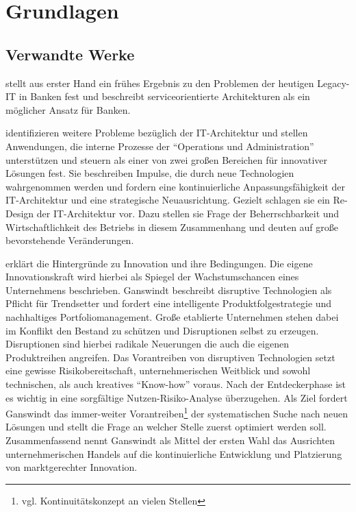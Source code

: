 \chapter{Grundlagen}
\label{chapter:grundlagen}

\section{Verwandte Werke}
\citet{Brockhoff2006} stellt aus erster Hand ein frühes Ergebnis zu den Problemen der heutigen Legacy-IT in Banken fest und beschreibt serviceorientierte Architekturen als ein möglicher Ansatz für Banken.

\citet{Bussmann2006} identifizieren weitere Probleme bezüglich der IT-Architektur und stellen Anwendungen, die interne Prozesse der \enquote{Operations und Administration} unterstützen und steuern als einer von zwei großen Bereichen für innovativer Lösungen fest. Sie beschreiben Impulse, die durch neue Technologien wahrgenommen werden und fordern eine kontinuierliche Anpassungsfähigkeit der IT-Architektur und eine strategische Neuausrichtung. Gezielt schlagen sie ein Re-Design der IT-Architektur vor. Dazu stellen sie Frage der Beherrschbarkeit und Wirtschaftlichkeit des Betriebs in diesem Zusammenhang und deuten auf große bevorstehende Veränderungen.

\citet{Ganswindt2006} erklärt die Hintergründe zu Innovation und ihre Bedingungen. Die eigene Innovationskraft wird hierbei als Spiegel der Wachstumschancen eines Unternehmens beschrieben. Ganswindt beschreibt disruptive Technologien als Pflicht für Trendsetter und fordert eine intelligente Produktfolgestrategie und nachhaltiges Portfoliomanagement. Große etablierte Unternehmen stehen dabei im Konflikt den Bestand zu schützen und Disruptionen selbst zu erzeugen. Disruptionen sind hierbei radikale Neuerungen die auch die eigenen Produktreihen angreifen. Das Vorantreiben von disruptiven Technologien setzt eine gewisse Risikobereitschaft, unternehmerischen Weitblick und sowohl technischen, als auch kreatives \enquote{Know-how} voraus. Nach der Entdeckerphase ist es wichtig in eine sorgfältige Nutzen-Risiko-Analyse überzugehen. Als Ziel fordert Ganswindt das immer-weiter Vorantreiben\footnote{vgl. Kontinuitätskonzept an vielen Stellen} der systematischen Suche nach neuen Lösungen und stellt die Frage an welcher Stelle zuerst optimiert werden soll. Zusammenfassend nennt Ganswindt als Mittel der ersten Wahl das Ausrichten unternehmerischen Handels auf die kontinuierliche Entwicklung und Platzierung von marktgerechter Innovation.

